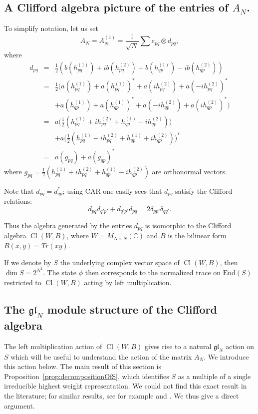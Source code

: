 \documentclass[11pt]{article}
\newcommand{\Cl}{\operatorname{Cl}}
\newcommand{\myd}{d}
\begin{document}
\subsection{A Clifford algebra picture of the entries of $A_N$.}

To simplify notation, let us set
$$A_N = A_N^{(1)} = \frac{1}{\sqrt{N}}\sum e_{pq} \otimes \myd_{pq},$$
where
\begin{eqnarray*} 
\myd_{pq} &=& \frac{1}{2}(b(h^{(1)}_{pq})  + i b(h^{(2)}_{pq})  + 
b(h^{(1)}_{qp}) - i b(h^{(2)}_{qp})) \\
&=& \frac{1}{2}\bigl( a(h^{(1)}_{pq}) + a(h^{(1)}_{pq})^* + a(i h^{(2)}_{pq}) +
a(-i h^{(2)}_{pq})^* \\ && + a(h^{(1)}_{qp}) + a(h^{(1)}_{qp})^* + 
a(-i h^{(2)}_{qp}) + a(i h^{(2)}_{qp})^*\bigr) \\
&=& a\bigl(\frac{1}{2}(h^{(1)}_{pq} + i h^{(2)}_{pq} + h^{(1)}_{qp} -i h^{(2)}_{qp})\bigr) 
\\ && + a\bigl(\frac{1}{2}( h^{(1)}_{pq} -i h^{(2)}_{pq} + h^{(1)}_{qp} + i h^{(2)}_{qp})\bigr)^* \\
&=& a(g_{pq}) + a(g_{qp})^*
\end{eqnarray*}
where $g_{pq} =\frac{1}{2}(h^{(1)}_{pq} + i h^{(2)}_{pq} + h^{(1)}_{qp} -i h^{(2)}_{qp}) $ are orthonormal vectors.

Note that $\myd_{pq}=\myd_{qp}^*$; using CAR one easily sees that $\myd_{pq}$ satisfy the Clifford relations:
$$
\myd_{pq}\myd_{q'p'}+\myd_{q'p'}\myd_{pq}=2\delta_{pp'}\delta_{qq'}.
$$

Thus the algebra generated by the entries $\myd_{pq}$ is isomorphic to the Clifford algebra $\Cl(W,B)$, where $W=M_{N\times N}(\mathbb{C})$ and $B$ is the bilinear form $B(x,y)=Tr(xy)$. 

If we denote by $S$ the underlying complex vector space of $\Cl(W,B)$, then $\dim S=2^{N^2}$. The state $\phi$ then corresponds to the normalized trace on $\textrm{End}(S)$ restricted to $\Cl(W,B)$ acting by left multiplication. 

\subsection{The \(\mathfrak{gl}_N\) module structure of the Clifford algebra}

The left multiplication action of $\Cl(W,B)$ gives rise to a natural $\mathfrak{gl}_N$ action on $S$ which will be useful to understand the action of the matrix $A_N$.  We introduce this action below. The main result of this section is Proposition~\ref{prop:decompositionOfS}, which identifies $S$ as a multiple of a single irreducible highest weight representation. We could not find this exact result in the literature; for similar results, see for example \cite[Proposition 2.4(ii), Example 2.5(1)]{panyushev} and \cite[pp. 356-358]{kostant}. We thus give a direct argument.
\end{document}
